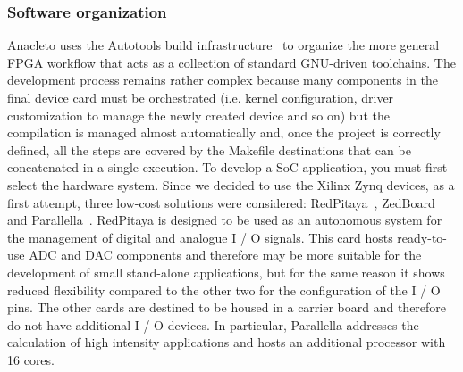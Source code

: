 \subsubsection*{Software organization}
Anacleto uses the Autotools build infrastructure~\cite{ana_13} to organize the more general FPGA workflow that acts as a collection of standard GNU-driven toolchains. The development process remains rather complex because many components in the final device card must be orchestrated (i.e. kernel configuration, driver customization to manage the newly created device and so on) but the compilation is managed almost automatically and, once the project is correctly defined, all the steps are covered by the Makefile destinations that can be concatenated in a single execution. To develop a SoC application, you must first select the hardware system. Since we decided to use the Xilinx Zynq devices, as a first attempt, three low-cost solutions were considered: RedPitaya~\cite{ana_14}, ZedBoard~\cite{ana_15} and Parallella~\cite{ana_16}. RedPitaya is designed to be used as an autonomous system for the management of digital and analogue I / O signals. This card hosts ready-to-use ADC and DAC components and therefore may be more suitable for the development of small stand-alone applications, but for the same reason it shows reduced flexibility compared to the other two for the configuration of the I / O pins. The other cards are destined to be housed in a carrier board and therefore do not have additional I / O devices. In particular, Parallella addresses the calculation of high intensity applications and hosts an additional processor with 16 cores.

